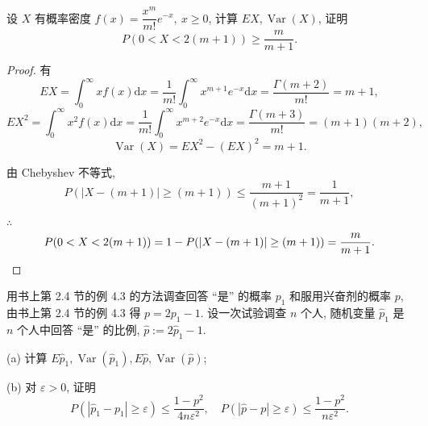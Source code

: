 \documentclass{ctexart}
\begin{document}
\begin{exercise}%
    设 $X$ 有概率密度 $f(x)=\dfrac{x^m}{m!}e^{-x},\ x\geq0$, 计算 $EX,\operatorname{Var}(X)$, 证明
    \[P(0<X<2(m+1))\geq\dfrac{m}{m+1}.\]
\end{exercise}
\begin{proof}
    有
    \[EX=\int_0^\infty xf(x)\mathrm{d}x=\dfrac{1}{m!}\int_0^\infty x^{m+1}e^{-x}\mathrm{d}x=\dfrac{\Gamma(m+2)}{m!}=m+1,\]
    \[EX^2=\int_0^\infty x^2f(x)\mathrm{d}x=\dfrac{1}{m!}\int_0^\infty x^{m+2}e^{-x}\mathrm{d}x=\dfrac{\Gamma(m+3)}{m!}=(m+1)(m+2),\]
    \[\operatorname{Var}(X)=EX^2-(EX)^2=m+1.\]

    由 Chebyshev 不等式,
    \[P(|X-(m+1)|\geq(m+1))\leq\dfrac{m+1}{(m+1)^2}=\dfrac{1}{m+1},\]

    $\therefore$
    \[P(0<X<2(m+1))=1-P(|X-(m+1)|\geq(m+1))=\dfrac{m}{m+1}.\qedhere\]
\end{proof}
\begin{exercise}%
    用书上第 2.4 节的例 4.3 的方法调查回答 ``是'' 的概率 $p_1$ 和服用兴奋剂的概率 $p$, 由书上第 2.4 节的例 4.3 得 $p=2p_1-1$. 设一次试验调查 $n$ 个人, 随机变量 $\hat{p}_1$ 是 $n$ 个人中回答 ``是'' 的比例, $\hat{p}:=2\hat{p}_1-1$.
    
    (a) 计算 $E\hat{p}_1,\operatorname{Var}(\hat{p}_1),E\hat{p},\operatorname{Var}(\hat{p})$;

    (b) 对 $\varepsilon>0$, 证明
    \[P(|\hat{p}_1-p_1|\geq\varepsilon)\leq\dfrac{1-p^2}{4n\varepsilon^2},\quad P(|\hat{p}-p|\geq\varepsilon)\leq\dfrac{1-p^2}{n\varepsilon^2}.\]
\end{exercise}
\end{document}
